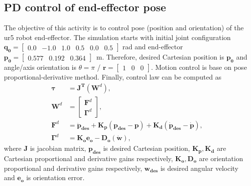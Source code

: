 \graphicspath{{images/act_3.1/}}
\subsection{PD control of end-effector pose}
The objective of this activity is to control pose (position and orientation) of the ur5 robot end-effector. The simulation starts with initial joint configuration $\mathbf{q_0}=\begin{bmatrix} 0.0 & -1.0 & 1.0 & 0.5 & 0.0 & 0.5 \end{bmatrix}$ rad and end-effector $\mathbf{p_0}=\begin{bmatrix}  0.577 &   0.192 &   0.364 \end{bmatrix}$~m. Therefore, desired Cartesian position is $\mathbf{p_0}$ and angle/axis orientation is  $\theta = \pi$ / $\mathbf{r}=\begin{bmatrix} 1 & 0 & 0 \end{bmatrix}$. Motion control is base on pose proportional-derivative method. Finally, control law can be computed as 
\begin{align}
	\boldsymbol{\tau} &= \mathbf{J^T} (\mathbf{W}^{d}), \label{eq:pose_PD}
	\\
	\mathbf{W}^{d} &=
	\begin{bmatrix}
	\mathbf{F}^{d} \\ \boldsymbol{\Gamma}^{d}
	\end{bmatrix}, 
	\nonumber \\
	\mathbf{F}^{d} &= \mathbf{\ddot{p}_{des}} + \mathbf{K_p (p_{des}-p)} + \mathbf{K_d (\dot{p}_{des}-\dot{p})}, 
	\nonumber \\
	\boldsymbol{\Gamma}^{d} &= \mathbf{K_o e_o} - \mathbf{D_o (\dot{w})}, \nonumber
\end{align}
\noindent where $\mathbf{J}$ is jacobian matrix, $\mathbf{p_{des}}$ is desired Cartesian position, $\mathbf{K_p, K_d}$ are Cartesian proportional and derivative gains respectively, $\mathbf{K_o, D_o}$ are orientation proportional and derivative gains respectively, $\mathbf{w_{des}}$ is desired angular velocity and $\mathbf{e_o}$ is orientation error. \vspace{.5cm}

